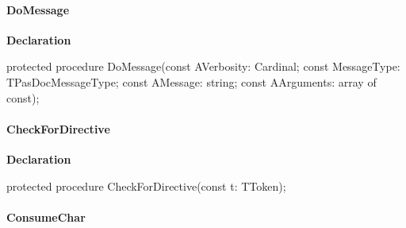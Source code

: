 \documentclass{report}
\newif\ifpdf
\begin{document}
\paragraph*{DoMessage}\hspace*{\fill}

\label{PasDoc_Tokenizer.TTokenizer-DoMessage}
\begin{list}{}{
\setlength{\itemindent}{0cm}
\setlength{\listparindent}{0cm}
\setlength{\leftmargin}{\evensidemargin}
\addtolength{\leftmargin}{\tmplength}
\settowidth{\labelsep}{X}
\addtolength{\leftmargin}{\labelsep}
\setlength{\labelwidth}{\tmplength}
}
\item[\textbf{Declaration}\hfill]
\ifpdf
\begin{flushleft}
\fi
\begin{ttfamily}
protected procedure DoMessage(const AVerbosity: Cardinal; const MessageType: TPasDocMessageType; const AMessage: string; const AArguments: array of const);\end{ttfamily}

\ifpdf
\end{flushleft}
\fi

\end{list}
\paragraph*{CheckForDirective}\hspace*{\fill}

\label{PasDoc_Tokenizer.TTokenizer-CheckForDirective}
\begin{list}{}{
\setlength{\itemindent}{0cm}
\setlength{\listparindent}{0cm}
\setlength{\leftmargin}{\evensidemargin}
\addtolength{\leftmargin}{\tmplength}
\settowidth{\labelsep}{X}
\addtolength{\leftmargin}{\labelsep}
\setlength{\labelwidth}{\tmplength}
}
\item[\textbf{Declaration}\hfill]
\ifpdf
\begin{flushleft}
\fi
\begin{ttfamily}
protected procedure CheckForDirective(const t: TToken);\end{ttfamily}

\ifpdf
\end{flushleft}
\fi

\end{list}
\paragraph*{ConsumeChar}\hspace*{\fill}
\end{document}
